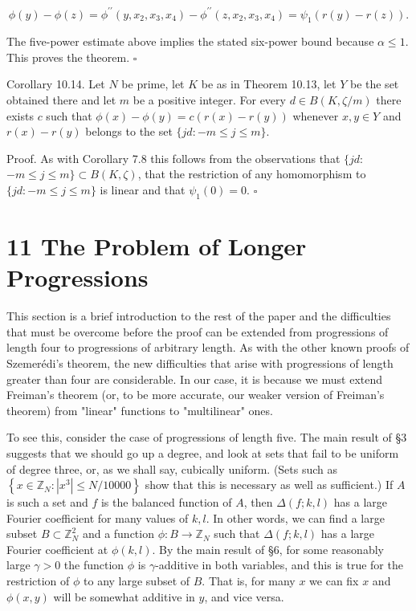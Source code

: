 \documentclass[10pt]{article}
\begin{document}
$$
\phi(y)-\phi(z)=\phi^{\prime \prime}\left(y, x_{2}, x_{3}, x_{4}\right)-\phi^{\prime \prime}\left(z, x_{2}, x_{3}, x_{4}\right)=\psi_1(r(y)-r(z)) .
$$

The five-power estimate above implies the stated six-power bound because $\alpha\leqslant1$. This proves the theorem. \(\square\)

Corollary 10.14. Let $N$ be prime, let $K$ be as in Theorem 10.13, let $Y$ be the set obtained there and let $m$ be a positive integer. For every $d \in B(K, \zeta / m)$ there exists $c$ such that $\phi(x)-\phi(y)=c(r(x)-r(y))$ whenever $x, y \in Y$ and $r(x)-r(y)$ belongs to the set $\{j d:-m \leqslant j \leqslant m\}$.

Proof. As with Corollary 7.8 this follows from the observations that $\{j d:$ $-m \leqslant j \leqslant m\} \subset B(K, \zeta)$, that the restriction of any homomorphism to $\{j d:-m \leqslant j \leqslant m\}$ is linear and that $\psi_{1}(0)=0$. \(\square\)

\section*{11 The Problem of Longer Progressions}
This section is a brief introduction to the rest of the paper and the difficulties that must be overcome before the proof can be extended from progressions of length four to progressions of arbitrary length. As with the other known proofs of Szemerédi's theorem, the new difficulties that arise with progressions of length greater than four are considerable. In our case, it is because we must extend Freiman's theorem (or, to be more accurate, our weaker version of Freiman's theorem) from "linear" functions to "multilinear" ones.

To see this, consider the case of progressions of length five. The main result of §3 suggests that we should go up a degree, and look at sets that fail to be uniform of degree three, or, as we shall say, cubically uniform. (Sets such as $\left\{x \in \mathbb{Z}_{N}:\left|x^{3}\right| \leqslant N / 10000\right\}$ show that this is necessary as well as sufficient.) If $A$ is such a set and $f$ is the balanced function of $A$, then $\Delta(f ; k, l)$ has a large Fourier coefficient for many values of $k, l$. In other words, we can find a large subset $B \subset \mathbb{Z}_{N}^{2}$ and a function $\phi: B \rightarrow \mathbb{Z}_{N}$ such that $\Delta(f ; k, l)$ has a large Fourier coefficient at $\phi(k, l)$. By the main result of §6, for some reasonably large $\gamma>0$ the function $\phi$ is $\gamma$-additive in both variables, and this is true for the restriction of $\phi$ to any large subset of $B$. That is, for many $x$ we can fix $x$ and $\phi(x, y)$ will be somewhat additive in $y$, and vice versa.
\end{document}
